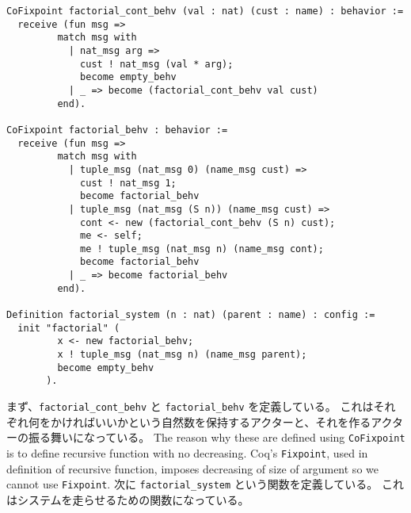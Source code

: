 \begin{lstlisting}
CoFixpoint factorial_cont_behv (val : nat) (cust : name) : behavior :=
  receive (fun msg =>
         match msg with
           | nat_msg arg =>
             cust ! nat_msg (val * arg);
             become empty_behv
           | _ => become (factorial_cont_behv val cust)
         end).

CoFixpoint factorial_behv : behavior :=
  receive (fun msg =>
         match msg with
           | tuple_msg (nat_msg 0) (name_msg cust) =>
             cust ! nat_msg 1;
             become factorial_behv
           | tuple_msg (nat_msg (S n)) (name_msg cust) =>
             cont <- new (factorial_cont_behv (S n) cust);
             me <- self;
             me ! tuple_msg (nat_msg n) (name_msg cont);
             become factorial_behv
           | _ => become factorial_behv
         end).

Definition factorial_system (n : nat) (parent : name) : config :=
  init "factorial" (
         x <- new factorial_behv;
         x ! tuple_msg (nat_msg n) (name_msg parent);
         become empty_behv
       ).
\end{lstlisting}

まず、\texttt{factorial\_cont\_behv} と \texttt{factorial\_behv} を定義している。
これはそれぞれ何をかければいいかという自然数を保持するアクターと、それを作るアクターの振る舞いになっている。
The reason why these are defined using \texttt{CoFixpoint} is to define recursive function with no decreasing.
Coq's \texttt{Fixpoint}, used in definition of recursive function, imposes decreasing of size of argument so we cannot use \texttt{Fixpoint}.
次に \texttt{factorial\_system} という関数を定義している。
これはシステムを走らせるための関数になっている。
